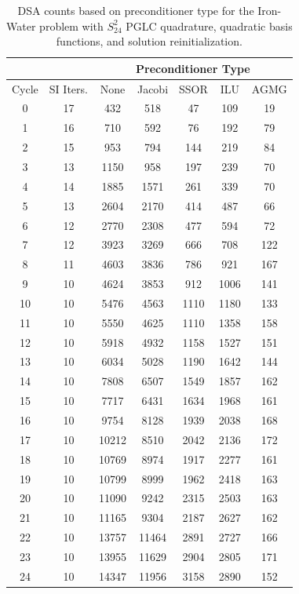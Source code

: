 \begin{table}
\caption{DSA counts based on preconditioner type for the Iron-Water problem with $S_{24}^2$ PGLC quadrature, quadratic basis functions, and solution reinitialization.}
\begin{center}
\def\arraystretch{1.25}
\begin{tabular}{|c|c|c|c|c|c|c|}
\hline
& & \multicolumn{5}{c}{Preconditioner Type}\vline\\
\hline
Cycle & SI Iters. & None&Jacobi&SSOR& ILU& AGMG \\
\hline
0&17&432&518&47&109&19\\
1&16&710&592&76&192&79\\
2&15&953&794&144&219&84\\
3&13&1150&958&197&239&70\\
4&14&1885&1571&261&339&70\\
5&13&2604&2170&414&487&66\\
6&12&2770&2308&477&594&72\\
7&12&3923&3269&666&708&122\\
8&11&4603&3836&786&921&167\\
9&10&4624&3853&912&1006&141\\
10&10&5476&4563&1110&1180&133\\
11&10&5550&4625&1110&1358&158\\
12&10&5918&4932&1158&1527&151\\
13&10&6034&5028&1190&1642&144\\
14&10&7808&6507&1549&1857&162\\
15&10&7717&6431&1634&1968&161\\
16&10&9754&8128&1939&2038&168\\
17&10&10212&8510&2042&2136&172\\
18&10&10769&8974&1917&2277&161\\
19&10&10799&8999&1962&2418&163\\
20&10&11090&9242&2315&2503&163\\
21&10&11165&9304&2187&2627&162\\
22&10&13757&11464&2891&2727&166\\
23&10&13955&11629&2904&2805&171\\
24&10&14347&11956&3158&2890&152\\
\hline
\end{tabular}
\end{center}
\label{tab::DSA_IW_PGLC24_k2_reinit}
\end{table}

